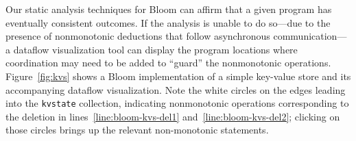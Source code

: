 
Our static analysis techniques for Bloom can
affirm that a given program has eventually consistent outcomes.
If the analysis is unable to do so---due to the presence of nonmonotonic deductions
that follow asynchronous communication---a dataflow visualization tool can display the
program locations where coordination may need to be added to ``guard'' the
nonmonotonic operations.  
Figure~\ref{fig:kvs} shows a Bloom implementation of a simple key-value store
and its accompanying dataflow visualization.  Note the white circles on the edges leading
into the \texttt{kvstate} collection, indicating nonmonotonic operations corresponding to 
the deletion in lines~\ref{line:bloom-kvs-del1} and~\ref{line:bloom-kvs-del2}; clicking on those circles brings up the relevant non-monotonic statements.


